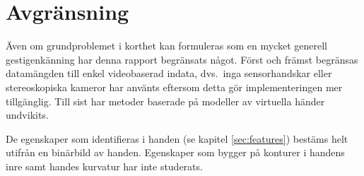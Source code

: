 \documentclass[../rapport_MVEX01-11-05]{subfiles}
\begin{document}
\section{Avgränsning}

Även om grundproblemet i korthet kan formuleras som en mycket generell
gestigenkänning har denna rapport begränsats något. Först och främst
begränsas datamängden till enkel videobaserad indata, dvs.~inga sensorhandskar
eller stereoskopiska kameror har använts eftersom detta gör implementeringen mer
tillgänglig. Till sist har metoder baserade på modeller av virtuella händer
undvikits.

De egenskaper som identifieras i handen (se kapitel
\ref{sec:features}) bestäms helt utifrån en binärbild av
handen. Egenskaper som bygger på konturer i handens inre samt handes
kurvatur har inte studerats.
\end{document}
